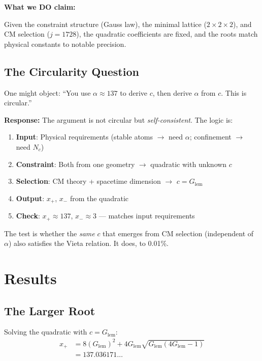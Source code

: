 \documentclass[11pt,a4paper]{article}
\theoremstyle{definition}
\theoremstyle{remark}
\newcommand{\Glem}{G_{\text{lem}}}
\begin{document}
\textbf{What we DO claim:}

Given the constraint structure (Gauss law), the minimal lattice ($2\times2\times2$), and CM selection ($j = 1728$), the quadratic coefficients are fixed, and the roots match physical constants to notable precision.

\subsection{The Circularity Question}

One might object: ``You use $\alpha \approx 137$ to derive $c$, then derive $\alpha$ from $c$. This is circular.''

\textbf{Response:} The argument is not circular but \emph{self-consistent}. The logic is:
\begin{enumerate}
    \item \textbf{Input}: Physical requirements (stable atoms $\to$ need $\alpha$; confinement $\to$ need $N_c$)
    \item \textbf{Constraint}: Both from one geometry $\to$ quadratic with unknown $c$
    \item \textbf{Selection}: CM theory + spacetime dimension $\to$ $c = \Glem$
    \item \textbf{Output}: $x_+$, $x_-$ from the quadratic
    \item \textbf{Check}: $x_+ \approx 137$, $x_- \approx 3$ --- matches input requirements
\end{enumerate}

The test is whether the \emph{same} $c$ that emerges from CM selection (independent of $\alpha$) also satisfies the Vieta relation. It does, to 0.01\%.

\section{Results}

\subsection{The Larger Root}

Solving the quadratic with $c = \Glem$:
\begin{align}
    x_+ &= 8(\Glem)^2 + 4\Glem\sqrt{\Glem(4\Glem - 1)} \\
    &= 137.036171\ldots
\end{align}
\end{document}
